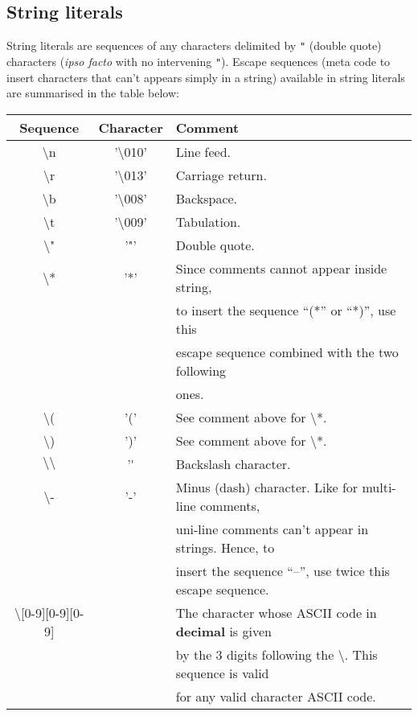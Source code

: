 \subsection{String literals}
\label{string literal}
String literals are sequences of any characters delimited by {\tt "}
(double quote) characters ({\em ipso facto} with no intervening
{\tt"}). 
Escape sequences (meta code to insert characters that can't appears
simply in a string) available in string literals are summarised in the
table below:

\medskip
\noindent
\begin{tabular}{|c|c|l|}
  \hline
  Sequence & Character & Comment \\
  \hline
  $\setminus$n & '$\setminus$010' & Line feed. \\
  \hline
  $\setminus$r & '$\setminus$013' & Carriage return. \\
  \hline
  $\setminus$b & '$\setminus$008' & Backspace. \\
  \hline
  $\setminus$t & '$\setminus$009' & Tabulation. \\
  \hline
  $\setminus$" & '"'              & Double quote. \\
  \hline
  $\setminus$* & '*'              & Since comments cannot appear
                                    inside string, \\
               &                  & to insert the
                                    sequence ``(*'' or ``*)'', use this \\
               &                  & escape sequence combined with the
                                    two following \\
               &                  & ones. \\
  \hline
  $\setminus$( & '('              & See comment above for $\setminus$*. \\
  \hline
  $\setminus$) & ')'              & See comment above for $\setminus$*. \\
  \hline
  $\setminus\setminus$ & '\'      & Backslash character. \\
  \hline
  $\setminus$- & '-' & Minus (dash) character. Like for multi-line
                                    comments, \\
               &                  & uni-line comments can't
                                    appear in strings. Hence, to \\
               &                  & insert the sequence ``--'', use
                                    twice this escape sequence. \\
  \hline
  $\setminus$[0-9][0-9][0-9] & & The character whose ASCII code in
                                {\bf decimal} is given \\
               &                  & by the 3 digits following the
                                  $\setminus$. This sequence is valid \\
               &                  & for any valid character
      ASCII code.\\
  \hline
\end{tabular}
